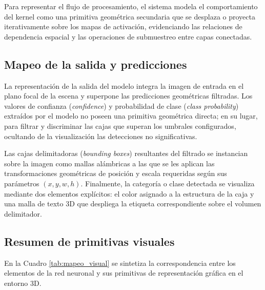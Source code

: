 Para representar el flujo de procesamiento, el sistema modela el comportamiento del kernel 
como una primitiva geométrica secundaria que se desplaza o proyecta 
iterativamente sobre los mapas de activación, evidenciando las relaciones de dependencia espacial y 
las operaciones de submuestreo entre capas conectadas.

\subsection{Mapeo de la salida y predicciones}
La representación de la salida del modelo integra la imagen de entrada en el plano focal de la escena 
y superpone las predicciones geométricas filtradas. Los valores de confianza (\textit{confidence}) y 
probabilidad de clase (\textit{class probability}) extraídos por el modelo no poseen una primitiva 
geométrica directa; en su lugar, para filtrar y 
discriminar las cajas que superan los umbrales configurados, ocultando de la visualización las 
detecciones no significativas.
\medskip

Las cajas delimitadoras (\textit{bounding boxes}) resultantes del filtrado se instancian sobre la 
imagen como mallas alámbricas a las que se les aplican las transformaciones geométricas de posición y 
escala requeridas según sus parámetros $(x, y, w, h)$. Finalmente, la categoría o clase detectada 
se visualiza mediante dos elementos explícitos: el color asignado a la estructura de la caja y 
una malla de texto 3D que despliega la etiqueta correspondiente sobre el volumen delimitador.

\subsection{Resumen de primitivas visuales}
En la Cuadro \ref{tab:mapeo_visual} se sintetiza la correspondencia entre los elementos de la red 
neuronal y sus primitivas de representación gráfica en el entorno 3D.

